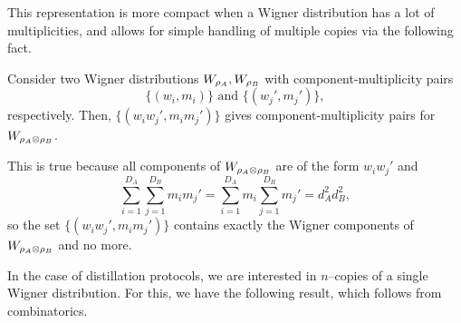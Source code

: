 \documentclass[pra,
aps,
twocolumn,
superscriptaddress,
groupedaddress,
nofootinbib,
reprint
]{revtex4-1}
\begin{document}
This representation is more compact when a Wigner distribution has a lot of multiplicities, and allows for simple handling of multiple copies via the following fact.
\begin{lemma}
Consider two Wigner distributions $\W{\rho_A}, \W{\rho_B}$ with component-multiplicity pairs 
\begin{equation}
	\{(w_i, m_i)\} \text{ and } \{(w_j', m_j')\},
\end{equation}
respectively. Then, $\{(w_i w_j', m_i m_j')\}$ gives component-multiplicity pairs for $\W{\rho_A \otimes \rho_B}$.
\end{lemma}

This is true because all components of $\W{\rho_A \otimes \rho_B}$ are of the form $w_i w_j'$ and 
\begin{equation*}
	\sum_{i=1}^{D_A}\sum_{j=1}^{D_B} m_i m_j' = \sum_{i=1}^{D_A} m_i \sum_{j=1}^{D_B} m_j' = d_A^2 d_B^2,
\end{equation*}
so the set $\{(w_i w_j', m_i m_j')\}$ contains exactly the Wigner components of $\W{\rho_A \otimes \rho_B}$ and no more.

In the case of distillation protocols, we are interested in $n$--copies of a single Wigner distribution. For this, we have the following result, which follows from combinatorics.
\end{document}
